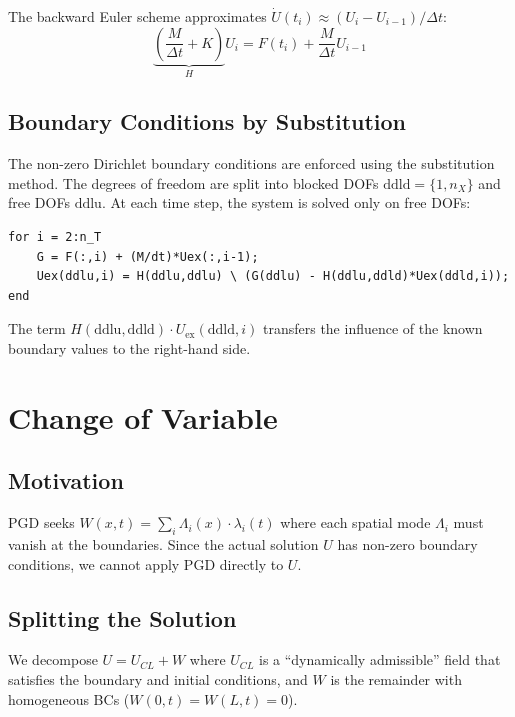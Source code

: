 \documentclass[11pt,a4paper]{article}
\begin{document}
The backward Euler scheme approximates $\dot{U}(t_i) \approx (U_i - U_{i-1})/\Delta t$:
\begin{equation}
    \underbrace{\left(\frac{M}{\Delta t} + K\right)}_{H} U_i = F(t_i) + \frac{M}{\Delta t}U_{i-1}
    \label{eq:euler}
\end{equation}

\subsection{Boundary Conditions by Substitution}

The non-zero Dirichlet boundary conditions are enforced using the substitution method. The degrees of freedom are split into blocked DOFs $\text{ddld} = \{1, n_X\}$ and free DOFs $\text{ddlu}$. At each time step, the system is solved only on free DOFs:
\begin{lstlisting}
for i = 2:n_T
    G = F(:,i) + (M/dt)*Uex(:,i-1);
    Uex(ddlu,i) = H(ddlu,ddlu) \ (G(ddlu) - H(ddlu,ddld)*Uex(ddld,i));
end
\end{lstlisting}

The term $H(\text{ddlu},\text{ddld}) \cdot U_{\text{ex}}(\text{ddld},i)$ transfers the influence of the known boundary values to the right-hand side.

\section{Change of Variable}

\subsection{Motivation}

PGD seeks $W(x,t) = \sum_i \Lambda_i(x)\cdot\lambda_i(t)$ where each spatial mode $\Lambda_i$ must vanish at the boundaries. Since the actual solution $U$ has non-zero boundary conditions, we cannot apply PGD directly to $U$.

\subsection{Splitting the Solution}

We decompose $U = U_{CL} + W$ where $U_{CL}$ is a ``dynamically admissible'' field that satisfies the boundary and initial conditions, and $W$ is the remainder with homogeneous BCs ($W(0,t) = W(L,t) = 0$).
\end{document}
